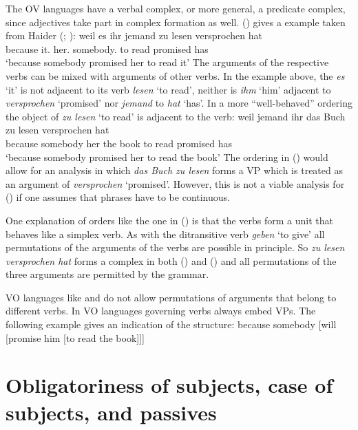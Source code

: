 The   OV languages have a verbal complex, or more general, a predicate complex, since adjectives take
part in complex formation as well. () gives a  example taken from Haider (\citeyear[]{Haider86c}; \citeyear[]{Haider90b}):
\ea
\gll weil es ihr jemand zu lesen versprochen hat\\
     because it.\ACC{} her.\DAT{} somebody.\NOM{} to read promised has\\\german
\glt `because somebody promised her to read it'
\z
The arguments of the respective verbs can be mixed with arguments of other verbs. In the example
above, the \emph{es} `it' is not adjacent to its verb \emph{lesen} `to read', neither is \emph{ihm}
`him' adjacent to \emph{versprochen} `promised' nor \emph{jemand} to \emph{hat} `has'. In a more
``well-behaved'' ordering the object of \emph{zu lesen} `to read' is adjacent to the verb:
\ea
\gll weil    jemand   ihr das Buch zu lesen versprochen hat\\
     because somebody her the book to read  promised    has\\
\glt `because somebody promised her to read the book'
\z
The ordering in () would allow for an analysis in which \emph{das Buch zu lesen} forms a VP
which is treated as an argument of \emph{versprochen} `promised'. However, this is not a viable
analysis for () if one assumes that phrases have to be continuous.

One explanation of orders like the one in () is that the verbs form a unit that behaves like a simplex verb. As with
the ditransitive verb \emph{geben} `to give' all permutations of the arguments of the verbs are
possible in principle. So \emph{zu lesen versprochen hat} forms a complex in both () and
() and all permutations of the three arguments are permitted by the grammar.

VO languages like  and  do not allow permutations of arguments that belong to different
verbs. In VO languages governing verbs always embed VPs. The following example gives an indication of the
structure:
\ea
because somebody [will [promise him [to read the book]]]
\z
{} 


\section{Obligatoriness of subjects, case of subjects, and passives}

